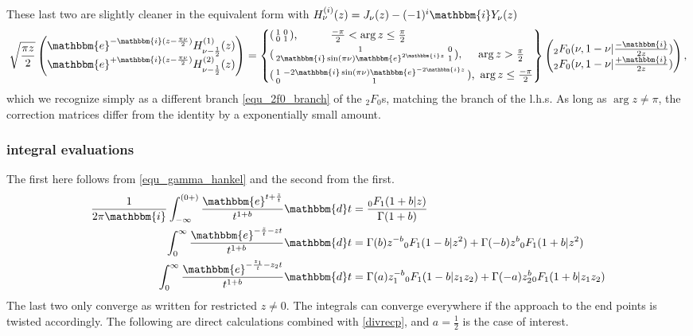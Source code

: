 \documentclass[12pt]{article}
\newcommand{\ee}[0] {\mathbbm{e}}
\newcommand{\ii}[0] {\mathbbm{i}}
\newcommand{\dd}[0] {\mathbbm{d}}
\numberwithin{equation}{section}
\begin{document}
These last two are slightly cleaner in the equivalent form with $H_{\nu}^{(i)}(z) = J_{\nu}(z) - (-1)^i \ii Y_{\nu}(z)$
\begin{equation*}
\sqrt{\frac{\pi z}{2}} \begin{pmatrix}
\ee^{-\ii (z - \frac{\pi \nu}{2})}H_{\nu-\frac{1}{2}}^{(1)}(z)\\
\ee^{+\ii (z - \frac{\pi \nu}{2})}H_{\nu-\frac{1}{2}}^{(2)}(z)
\end{pmatrix}
=
\left\{
\begin{aligned}
&(\begin{smallmatrix} 1&0\\ 0 &1\end{smallmatrix})\text{,} \quad \quad \quad \tfrac{-\pi}{2} < \arg z \le \tfrac{\pi}{2}\\
&(\begin{smallmatrix} 1& 0\\ 2\ii \sin(\pi \nu) \ee^{2 \ii z} &1\end{smallmatrix})\text{, } \quad \arg z> \tfrac{\pi}{2}\\
&(\begin{smallmatrix} 1&-2\ii \sin(\pi \nu) \ee^{-2 \ii z}\\ 0  &1\end{smallmatrix})\text{, } \arg z \le \tfrac{-\pi}{2}
\end{aligned}
\right\}
\begin{pmatrix}
{}_2 F_0(\nu,1-\nu|\tfrac{-\ii}{2 z})\\
{}_2 F_0(\nu,1-\nu|\tfrac{+\ii}{2 z})
\end{pmatrix}\text{,}
\end{equation*}
which we recognize simply as a different branch \eqref{equ_2f0_branch} of the ${}_2 F_0$s, matching the branch of the l.h.s. As long as $\arg z \ne \pi$, the correction matrices differ from the identity by a exponentially small amount.
\subsubsection{integral evaluations}
The first here follows from \eqref{equ_gamma_hankel} and the second from the first.
\begin{align*}
\frac{1}{2\pi \ii} \int_{-\infty}^{(0+)} \frac{\ee^{t + \frac{z}{t}}}{t^{1+b}} \dd t &= \frac{{}_0 F_{1} (1+b|z)}{\Gamma(1+b)}\\
\int_{0}^{\infty} \frac{\ee^{-\frac{z}{t} - z t}}{t^{1+b}} \dd t & = \Gamma(b) z^{-b} {}_0 F_{1} (1-b|z^2) + \Gamma(-b) z^{b} {}_0 F_{1} (1+b|z^2) \\
\int_{0}^{\infty} \frac{\ee^{-\frac{z_1}{t} - z_2 t}}{t^{1+b}} \dd t & = \Gamma(a) z_1^{-b} {}_0 F_{1} (1-b|z_1 z_2) + \Gamma(-a) z_2^{b} {}_0 F_{1} (1+b| z_1 z_2)
\end{align*}
The last two only converge as written for restricted $z \ne 0$. The integrals can converge everywhere if the approach to the end points is twisted accordingly. The following are direct calculations combined with \eqref{divrecp}, and $a=\frac12$ is the case of interest.
\end{document}
